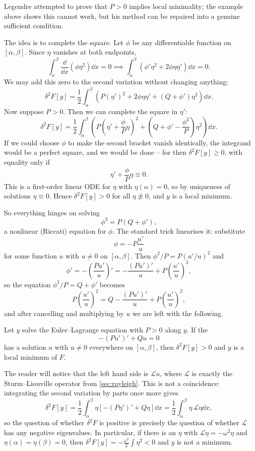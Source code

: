 \documentclass[a4paper]{scrartcl}
\begin{document}
Legendre attempted to prove that $P > 0$ implies local minimality; the example above shows this cannot work, but his method can be repaired into a genuine sufficient condition.

The idea is to complete the square. Let $\phi$ be any differentiable function on $[\alpha, \beta]$. Since $\eta$ vanishes at both endpoints,
$$
\int_\alpha^\beta\frac{\dd}{\dd x}\left(\phi\eta^2\right)\dd x = 0 \implies \int_\alpha^\beta \left(\phi'\eta^2 + 2\phi\eta\eta'\right)\dd x = 0.
$$
We may add this zero to the second variation without changing anything:
$$
\delta^2 F[y] = \frac{1}{2}\int_\alpha^\beta\left(P(\eta')^2 + 2\phi\eta\eta' + (Q + \phi')\eta^2\right)\dd x.
$$
Now suppose $P > 0$. Then we can complete the square in $\eta'$:
$$
\delta^2 F[y] = \frac12\int_\alpha^\beta\left(P\left(\eta' + \frac{\phi}{P}\eta\right)^2 + \left(Q + \phi' - \frac{\phi^2}{P}\right)\eta^2\right)\dd x.
$$
If we could choose $\phi$ to make the second bracket vanish identically, the integrand would be a perfect square, and we would be done -- for then $\delta^2 F[y] \geq 0$, with equality only if
$$
\eta' + \frac{\phi}{P}\eta \equiv 0.
$$
This is a first-order linear ODE for $\eta$ with $\eta(\alpha) = 0$, so by uniqueness of solutions $\eta \equiv 0$. Hence $\delta^2 F[y] > 0$ for all $\eta \not\equiv 0$, and $y$ is a local minimum.

So everything hinges on solving
$$
\phi^2 = P(Q + \phi'),
$$
a nonlinear (Riccati) equation for $\phi$. The standard trick linearises it: substitute
$$
\phi = -P\frac{u'}{u}
$$
for some function $u$ with $u \neq 0$ on $[\alpha, \beta]$. Then $\phi^2/P = P(u'/u)^2$ and
$$
\phi' = -\left(\frac{Pu'}{u}\right)' = -\frac{(Pu')'}{u} + P\left(\frac{u'}{u}\right)^2,
$$
so the equation $\phi^2/P = Q + \phi'$ becomes
$$
P\left(\frac{u'}{u}\right)^2 = Q - \frac{(Pu')'}{u} + P\left(\frac{u'}{u}\right)^2,
$$
and after cancelling and multiplying by $u$ we are left with the following.

\begin{theorem}
	Let $y$ solve the Euler--Lagrange equation with $P > 0$ along $y$. If the 
	$$
	-\left(Pu'\right)' + Qu = 0
	$$
	has a solution $u$ with $u \neq 0$ everywhere on $[\alpha, \beta]$, then $\delta^2 F[y] > 0$ and $y$ is a local minimum of $F$.
\end{theorem}

The reader will notice that the left hand side is $\mathcal{L}u$, where $\mathcal{L}$ is exactly the Sturm--Liouville operator from \autoref{sec:rayleigh}. This is not a coincidence: integrating the second variation by parts once more gives
$$
\delta^2 F[y] = \frac{1}{2}\int_\alpha^\beta \eta\left[-(P\eta')' + Q\eta\right]\dd x = \frac12\int_\alpha^\beta \eta\, \mathcal{L}\eta \dd x,
$$
so the question of whether $\delta^2 F$ is positive is precisely the question of whether $\mathcal{L}$ has any negative eigenvalues. In particular, if there is an $\eta$ with $\mathcal{L}\eta = -\omega^2\eta$ and $\eta(\alpha) = \eta(\beta) = 0$, then $\delta^2 F[y] = -\frac{\omega^2}{2}\int\eta^2 < 0$ and $y$ is not a minimum.
\end{document}
